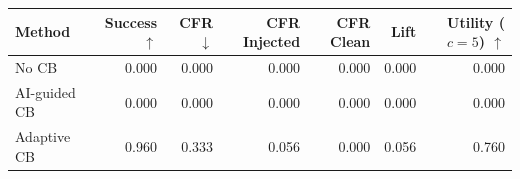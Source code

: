 \begin{tabular}{lrrrrrr}
\toprule
Method & Success $\uparrow$ & CFR $\downarrow$ & CFR Injected & CFR Clean & Lift & Utility ($c=5$) $\uparrow$ \\
\midrule
No CB & 0.000 & 0.000 & 0.000 & 0.000 & 0.000 & 0.000 \\
AI-guided CB & 0.000 & 0.000 & 0.000 & 0.000 & 0.000 & 0.000 \\
Adaptive CB & 0.960 & 0.333 & 0.056 & 0.000 & 0.056 & 0.760 \\
\bottomrule
\end{tabular}
